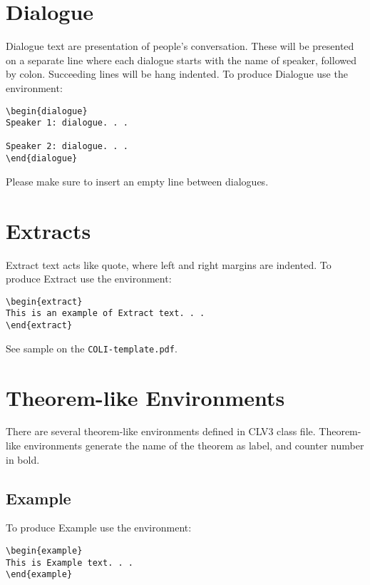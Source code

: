 \documentclass{clv3}
\begin{document}
\section{Dialogue}

Dialogue text are presentation of people's conversation. These will be presented
on a separate line where each dialogue starts with the name of speaker, followed by
colon. Succeeding lines will be hang indented. To produce Dialogue use the environment:
\\
\begin{verbatim}
\begin{dialogue}
Speaker 1: dialogue. . .

Speaker 2: dialogue. . .
\end{dialogue}
\end{verbatim}


\noindent Please make sure to insert an empty line between dialogues.

\section{Extracts}

Extract text acts like quote, where left and right margins are indented.
To produce Extract use the environment:

\begin{verbatim}
\begin{extract}
This is an example of Extract text. . .
\end{extract}
\end{verbatim}

\noindent See sample on the {\tt COLI-template.pdf}.

\section{Theorem-like Environments}

There are several theorem-like environments defined in CLV3 class file. Theorem-like
environments generate the name of the theorem as label, and counter number in bold.

\subsection{Example}

To produce Example use the environment:

\begin{verbatim}
\begin{example}
This is Example text. . .
\end{example}
\end{verbatim}
\end{document}
